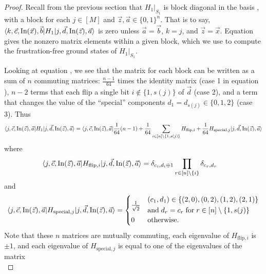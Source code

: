 \documentclass[../thesis-main/thesis-main]{subfiles}
\begin{document}
\begin{proof}
Recall from the previous section that $H_{1}|_{S_1}$ is block diagonal in the basis , with a block for each $j\in[M]$ and $\vec{z},\vec{a}\in\{0,1\}^{n}$. That is to say, $\langle k,\vec{c},\operatorname{In}(\vec{x}),\vec{b}|H_{1}|j,\vec{d},\operatorname{In}(\vec{z}),\vec{a}\rangle$ is zero unless $\vec{a}=\vec{b}$, $k=j$, and $\vec{z}=\vec{x}$. Equation  gives the nonzero matrix elements within a given block, which we use to compute the frustration-free ground states of $H_{1}|_{S_{1}}$.

Looking at equation , we see that the matrix for each block can be written as a sum of $n$ commuting matrices: $\frac{n-1}{64}$ times the identity matrix (case 1 in equation ), $n-2$ terms that each flip a single bit $i\notin\{1,s(j)\}$ of $\vec{d}$ (case 2), and a term that changes the value of the ``special'' components $d_{1}=d_{s(j)}\in\{0,1,2\}$ (case 3). Thus
\begin{equation}
\langle j,\vec{c},\operatorname{In}(\vec{z}),\vec{a}|H_{1}|j,\vec{d},\operatorname{In}(\vec{z}),\vec{a}\rangle=\langle j,\vec{c},\operatorname{In}(\vec{z}),\vec{a}|\frac{1}{64}(n-1)+\frac{1}{64}\sum_{i\in[n]\setminus\{1,s(j)\}}H_{\mathrm{flip},i}+\frac{1}{64}H_{\mathrm{special},j}|j,\vec{d},\operatorname{In}(\vec{z}),\vec{a}\rangle
\end{equation}
where
\begin{align}
\langle j,\vec{c},\operatorname{In}(\vec{z}),\vec{a}|H_{\mathrm{flip},i}|j,\vec{d},\operatorname{In}(\vec{z}),\vec{a}\rangle &= \delta_{c_{i},d_{i}\oplus1} \prod_{r\in[n]\setminus\{i\}}\delta_{c_{r},d_{r}}
\end{align}
and 
\begin{equation}
\langle j,\vec{c},\operatorname{In}(\vec{z}),\vec{a}|H_{\mathrm{special},j}|j,\vec{d},\operatorname{In}(\vec{z}),\vec{a}\rangle=\begin{cases}
\frac{1}{\sqrt{2}} & \begin{aligned}
  &(c_{1},d_{1})\in\{(2,0),(0,2),(1,2),(2,1)\}\\ 
  &\text{and}\; d_{r}=c_{r}\;\text{for}\; r\in [n]\setminus\{1,s(j)\}
\end{aligned}\\
0 & \text{otherwise.}
\end{cases}
\end{equation}
Note that these $n$ matrices are mutually commuting, each eigenvalue of $H_{\mathrm{flip},i}$ is $\pm1$, and each eigenvalue of $H_{\mathrm{special},j}$ is equal to one of the eigenvalues of the matrix 
\begin{equation}

\end{equation}
\end{proof}
\end{document}
